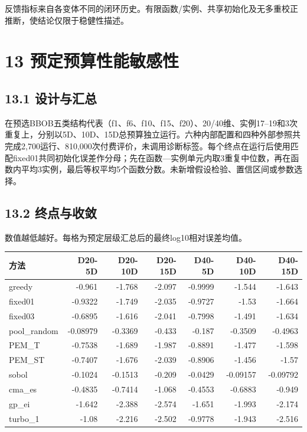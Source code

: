\documentclass[11pt,a4paper]{article}
\begin{document}
反馈指标来自各变体不同的闭环历史。有限函数/实例、共享初始化及无多重校正推断，使结论仅限于稳健性描述。

\hypertarget{ux9884ux5b9aux9884ux7b97ux6027ux80fdux654fux611fux6027}{%
\section{13
预定预算性能敏感性}\label{ux9884ux5b9aux9884ux7b97ux6027ux80fdux654fux611fux6027}}

\hypertarget{ux8bbeux8ba1ux4e0eux6c47ux603b}{%
\subsection{13.1 设计与汇总}\label{ux8bbeux8ba1ux4e0eux6c47ux603b}}

在预选BBOB五类结构代表（f1、f6、f10、f15、f20）、20/40维、实例17--19和3次重复上，分别以5D、10D、15D总预算独立运行。六种内部配置和四种外部参照共完成2,700运行、810,000次付费评价，未调用诊断标签。每个终点在运行后使用匹配fixed01共同初始化误差作分母；先在函数---实例单元内取3重复中位数，再在函数内平均3实例，最后等权平均5个函数分数。未新增假设检验、置信区间或参数选择。

\hypertarget{ux7ec8ux70b9ux4e0eux6536ux655b-1}{%
\subsection{13.2 终点与收敛}\label{ux7ec8ux70b9ux4e0eux6536ux655b-1}}

数值越低越好。每格为预定层级汇总后的最终log10相对误差均值。

\par\noindent\begin{minipage}{\linewidth}

\begin{longtable}[]{@{}lrrrrrr@{}}
\toprule
方法 & D20-5D & D20-10D & D20-15D & D40-5D & D40-10D & D40-15D \\
\midrule
\endhead
greedy & -0.961 & -1.768 & -2.097 & -0.9999 & -1.544 & -1.643 \\
fixed01 & -0.9322 & -1.749 & -2.035 & -0.9727 & -1.53 & -1.664 \\
fixed03 & -0.6895 & -1.616 & -2.041 & -0.7998 & -1.491 & -1.634 \\
pool\_random & -0.08979 & -0.3369 & -0.433 & -0.187 & -0.3509 &
-0.4963 \\
PEM\_T & -0.7538 & -1.689 & -1.987 & -0.8891 & -1.477 & -1.598 \\
PEM\_ST & -0.7407 & -1.676 & -2.039 & -0.8906 & -1.456 & -1.57 \\
sobol & -0.1024 & -0.1513 & -0.209 & -0.0429 & -0.09157 & -0.09792 \\
cma\_es & -0.4835 & -0.7414 & -1.068 & -0.4553 & -0.6883 & -0.949 \\
gp\_ei & -1.642 & -2.388 & -2.574 & -1.651 & -1.993 & -2.174 \\
turbo\_1 & -1.08 & -2.216 & -2.502 & -0.9778 & -1.943 & -2.516 \\
\bottomrule
\end{longtable}

\end{minipage}\par
\end{document}
